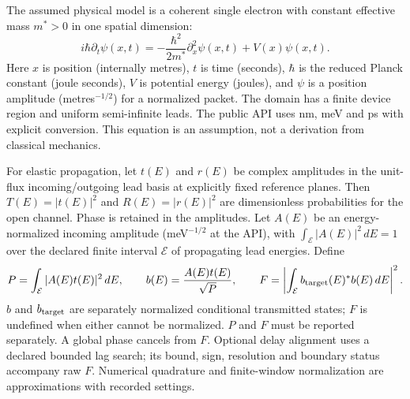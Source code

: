 The assumed physical model is a coherent single electron with constant effective
mass $m^*>0$ in one spatial dimension:
\[
i\hbar\partial_t\psi(x,t)=-\frac{\hbar^2}{2m^*}\partial_x^2\psi(x,t)+V(x)\psi(x,t).
\]
Here $x$ is position (internally metres), $t$ is time (seconds), $\hbar$ is the
reduced Planck constant (joule seconds), $V$ is potential energy (joules), and
$\psi$ is a position amplitude (metres$^{-1/2}$) for a normalized packet.
The domain has a finite device region and uniform semi-infinite leads. The
public API uses nm, meV and ps with explicit conversion. This equation is an
assumption, not a derivation from classical mechanics.

For elastic propagation, let $t(E)$ and $r(E)$ be complex amplitudes in the
unit-flux incoming/outgoing lead basis at explicitly fixed reference planes.
Then $T(E)=|t(E)|^2$ and $R(E)=|r(E)|^2$ are dimensionless probabilities for the
open channel. Phase is retained in the amplitudes. Let $A(E)$ be an
energy-normalized incoming amplitude (meV$^{-1/2}$ at the API), with
$\int_{\mathcal E}|A(E)|^2\,dE=1$ over the declared finite interval
$\mathcal E$ of propagating lead energies. Define
\[
P=\int_{\mathcal E}|A(E)t(E)|^2\,dE,\qquad
b(E)=\frac{A(E)t(E)}{\sqrt P},\qquad
F=\left|\int_{\mathcal E}b_{\rm target}(E)^*b(E)\,dE\right|^2.
\]
$b$ and $b_{\rm target}$ are separately normalized conditional transmitted
states; $F$ is undefined when either cannot be normalized. $P$ and $F$ must be
reported separately. A global phase cancels from $F$. Optional delay alignment
uses a declared bounded lag search; its bound, sign, resolution and boundary
status accompany raw $F$. Numerical quadrature and finite-window normalization
are approximations with recorded settings.

